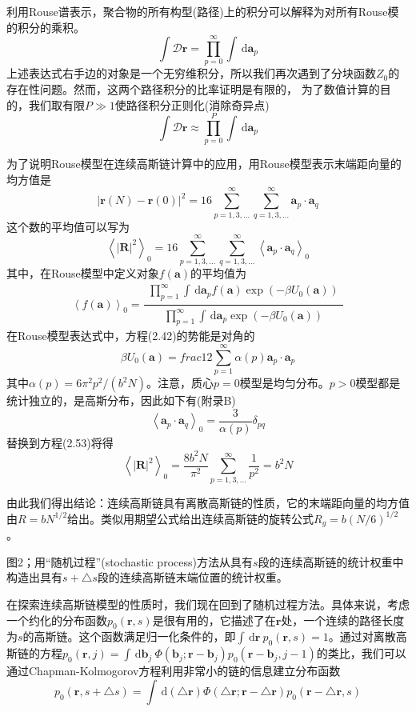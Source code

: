 \documentclass{article}
\begin{document}
利用Rouse谱表示，聚合物的所有构型(路径)上的积分可以解释为对所有Rouse模的积分的乘积。
$$\int \mathcal{D}\mathbf{r}= \prod_{p=0}^{\infty} \int \, \mathrm{d} \mathbf{a}_p$$
上述表达式右手边的对象是一个无穷维积分，所以我们再次遇到了分块函数$Z_0$的存在性问题。然而，这两个路径积分的比率证明是有限的，
为了数值计算的目的，我们取有限$P\gg1$使路径积分正则化(消除奇异点)
$$\int \mathcal{D}\mathbf{r}\approx \prod_{p=0}^{P} \int \, \mathrm{d} \mathbf{a}_p$$

为了说明Rouse模型在连续高斯链计算中的应用，用Rouse模型表示末端距向量的均方值是
$$\left | \mathbf{r}(N)-\mathbf{r}(0) \right |^2=16\sum_{p=1,3,...}^{\infty}\sum_{q=1,3,...}^{\infty} \mathbf{a}_p \cdot \mathbf{a}_q$$
这个数的平均值可以写为
$$\left \langle \left| \mathbf{R} \right|^2 \right \rangle _0=16\sum_{p=1,3,...}^{\infty}\sum_{q=1,3,...}^{\infty} \left \langle \mathbf{a}_p \cdot \mathbf{a}_q \right \rangle _0$$
其中，在Rouse模型中定义对象$f(\mathbf{a})$的平均值为
$$\left \langle f(\mathbf{a}) \right \rangle _0=\frac{\begin{matrix} \prod_{p=1}^{\infty} \int \, \mathrm{d} \mathbf{a}_p f(\mathbf{a})\exp(-\beta U_0(\mathbf{a})) \end{matrix}}{\begin{matrix} \prod_{p=1}^{\infty} \int \, \mathrm{d} \mathbf{a}_p \exp(-\beta U_0(\mathbf{a})) \end{matrix}}$$
在Rouse模型表达式中，方程(2.42)的势能是对角的
$$\beta U_0(\mathbf{a})=frac{1}{2}\sum_{p=1}^{\infty}\alpha (p)\mathbf{a}_p \cdot \mathbf{a}_p$$
其中$\alpha (p)=6\pi ^2p^2/(b^2N)$。注意，质心$p=0$模型是均匀分布。$p>0$模型都是统计独立的，是高斯分布，因此如下有(附录B)
$$\left \langle \mathbf{a}_p \cdot \mathbf{a}_q \right \rangle _0=\frac{3}{\alpha (p)}\delta _{pq}$$
替换到方程(2.53)将得
$$\left \langle \left| \mathbf{R} \right|^2 \right \rangle _0=\frac{8b^2N}{\pi ^2}\sum_{p=1,3,...}^{\infty}\frac{1}{p^2}=b^2N$$

由此我们得出结论：连续高斯链具有离散高斯链的性质，它的末端距向量的均方值由$R=bN^{1/2}$给出。类似用期望公式给出连续高斯链的旋转公式$R_g=b(N/6)^{1/2}$。


图2；用“随机过程”(stochastic process)方法从具有$s$段的连续高斯链的统计权重中构造出具有$s+\bigtriangleup s$段的连续高斯链末端位置的统计权重。



在探索连续高斯链模型的性质时，我们现在回到了随机过程方法。具体来说，考虑一个约化的分布函数$p_0 (\mathbf{r},s)$是很有用的，它描述了在$\mathbf {r}$处，一个连续的路径长度为$s$的高斯链。这个函数满足归一化条件的，即$\int \, \mathrm{d} \mathbf{r}~p_0(\mathbf{r},s)=1$。通过对离散高斯链的方程$p_0(\mathbf{r},j)=\int \, \mathrm{d} \mathbf{b}_j~\Phi(\mathbf{b}_j;\mathbf{r}-\mathbf{b}_j)p_0(\mathbf{r}-\mathbf{b}_j,j-1)$的类比，我们可以通过Chapman-Kolmogorov方程利用非常小的链的信息建立分布函数
$$p_0(\mathbf{r},s+\bigtriangleup s)=\int \, \mathrm{d}(\bigtriangleup \mathbf{r})\Phi(\bigtriangleup \mathbf{r};\mathbf{r}-\bigtriangleup \mathbf{r})p_0(\mathbf{r}-\bigtriangleup \mathbf{r},s)$$
\end{document}
